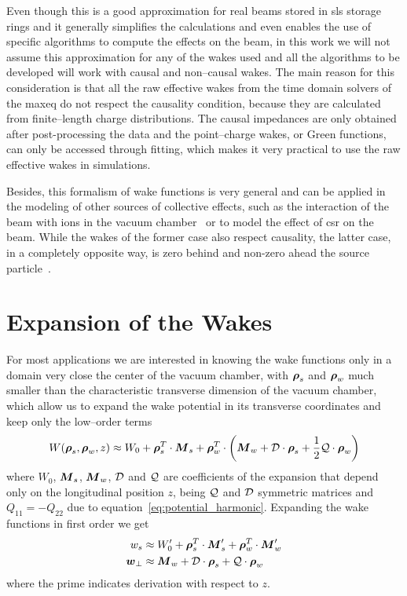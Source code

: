     Even though this is a good approximation for real beams stored in \gls{sls} storage rings and it generally simplifies the calculations and even enables the use of specific algorithms to compute the effects on the beam, in this work we will not assume this approximation for any of the wakes used and all the algorithms to be developed will work with causal and non--causal wakes. The main reason for this consideration is that all the raw effective wakes from the time domain solvers of the \gls{maxeq} do not respect the causality condition, because they are calculated from finite--length charge distributions. The causal impedances are only obtained after post-processing the data and the point--charge wakes, or Green functions, can only be accessed through fitting, which makes it very practical to use the raw effective wakes in simulations.

    Besides, this formalism of wake functions is very general and can be applied in the modeling of other sources of collective effects, such as the interaction of the beam with ions in the vacuum chamber~\cite{Wang2013a} or to model the effect of \gls{csr} on the beam. While the wakes of the former case also respect causality, the latter case, in a completely opposite way, is zero behind and non-zero ahead the source particle~\cite{Derbenev1995}.

\section{Expansion of the Wakes}

    For most applications we are interested in knowing the wake functions only in a domain very close the center of the vacuum chamber, with $\boldsymbol{\rho}_s$ and $\boldsymbol{\rho}_w$ much smaller than the characteristic transverse dimension of the vacuum chamber, which allow us to expand the wake potential in its transverse coordinates and keep only the low--order terms
    \begin{align}\label{eq:wake_potential_expansion}
      	W(\boldsymbol{\rho}_s, \boldsymbol{\rho}_w, z) \approx W_0 +
	  	\boldsymbol{\rho}_s^T\cdot\boldsymbol{M}_s +
        \boldsymbol{\rho}_w^T\cdot\left(\boldsymbol{M}_w +
	  	                         \mathcal{D}\cdot\boldsymbol{\rho}_s +
	  	                         \frac12\mathcal{Q}\cdot\boldsymbol{\rho}_w\right)
    \end{align}
    where $W_0$, $\boldsymbol{M}_s$, $\boldsymbol{M}_w$, $\mathcal{D}$ and $\mathcal{Q}$ are coefficients of the expansion that depend only on the longitudinal position $z$, being $\mathcal{Q}$ and $\mathcal{D}$ symmetric matrices and $Q_{11}=-Q_{22}$ due to equation~\eqref{eq:potential_harmonic}. Expanding the wake functions in first order we get
    \begin{align}\label{eq:wake_functions_expansion}
      	w_s &\approx W'_0 + \boldsymbol{\rho}_s^T\cdot\boldsymbol{M}'_s + \boldsymbol{\rho}_w^T\cdot\boldsymbol{M}'_w \\
	  	\boldsymbol{w}_\perp &\approx \boldsymbol{M}_w + \mathcal{D}\cdot\boldsymbol{\rho}_s + \mathcal{Q}\cdot\boldsymbol{\rho}_w
    \end{align}
    where the prime indicates derivation with respect to $z$.

